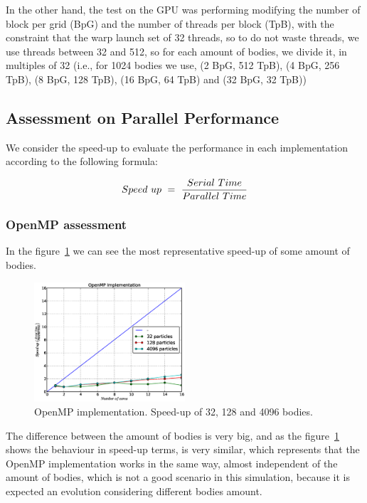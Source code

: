 In the other hand,
the test on the GPU was performing modifying the number of block per grid (BpG)
and the number of threads per block (TpB), with the constraint
that the warp launch set of 32 threads, so to do not waste threads,
we use threads between 32 and 512, so for each amount of bodies,
we divide it, in multiples of 32 (i.e., for 1024 bodies we use,
(2 BpG, 512 TpB), (4 BpG, 256 TpB), (8 BpG, 128 TpB), (16 BpG, 64 TpB) and
(32 BpG, 32 TpB)) 

\subsection{Assessment on Parallel Performance}

We consider the speed-up to evaluate the performance
in each implementation according to the following formula:

\begin{equation}
Speed\  up\ =\ \frac{Serial\ Time}{Parallel\ Time} \\
\end{equation}

\subsubsection{OpenMP assessment}

In the figure~\ref{fig:openmp} we can see the most representative speed-up of some
amount of bodies.

\begin{figure}[h!t]
    \centering
    \includegraphics[width=0.5\textwidth]{images/openmp.eps}
    \caption{OpenMP implementation. Speed-up of 32, 128 and 4096 bodies.}
    \label{fig:openmp}
\end{figure}

The difference between the amount of bodies is very big,
and as the figure~\ref{fig:openmp} shows the behaviour in speed-up terms,
is very similar, which represents that the OpenMP implementation works
in the same way, almost independent of the amount of bodies, which is not
a good scenario in this simulation, because it is expected an evolution
considering different bodies amount.


